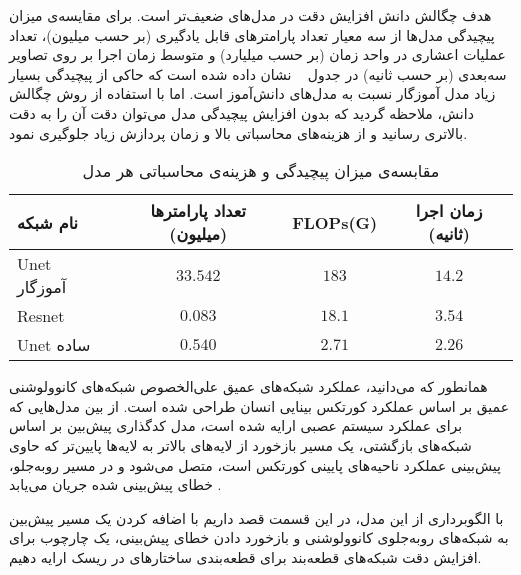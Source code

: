 هدف چگالش دانش افزایش دقت در مدل‌های ضعیف‌تر است. برای مقایسه‌ی میزان پیچیدگی مدل‌ها از سه معیار تعداد پارامترهای قابل یادگیری (بر حسب میلیون)، تعداد عملیات اعشاری در واحد زمان (بر حسب میلیارد) و متوسط زمان اجرا بر روی تصاویر سه‌بعدی (بر حسب ثانیه) در جدول ~ نشان داده شده است که حاکی از پیچیدگی بسیار زیاد مدل آموزگار نسبت به مدل‌های دانش‌آموز است. اما با استفاده از روش چگالش دانش، ملاحظه گردید که بدون افزایش پیچیدگی مدل می‌توان دقت آن را به دقت بالاتری رسانید و از هزینه‌های محاسباتی بالا و زمان پردازش زیاد جلوگیری نمود.


\begin{table}[H]
	\caption{مقابسه‌ی میزان پیچیدگی و هزینه‌ی محاسباتی هر مدل}
	\label{modelscomplexity}
	\centering
	\begin{tabular}{lccc}
		\toprule
		نام شبکه & تعداد پارامترها (میلیون) & FLOPs(G) &زمان اجرا (ثانیه) \\
		\midrule
		Unet آموزگار & $33.542$ & $183$ & $14.2$ \\
		Resnet & $0.083$ & $18.1$ & $3.54$ \\
		Unet ساده & $0.540$ & $2.71$ & $2.26$ \\
		
		\bottomrule
	\end{tabular}
\end{table}


همانطور که می‌دانید، عملکرد شبکه‌های عمیق علی‌الخصوص شبکه‌های کانوولوشنی عمیق بر اساس عملکرد کورتکس بینایی انسان طراحی شده است. از بین مدل‌هایی که برای عملکرد سیستم عصبی ارایه شده است، مدل کدگذاری پیش‌بین  بر اساس شبکه‌های بازگشتی، یک مسیر بازخورد از لایه‌های بالاتر به لایه‌ها پایین‌تر که حاوی پیش‌بینی عملکرد ناحیه‌های پایینی کورتکس است، متصل می‌شود و در مسیر روبه‌جلو، خطای پیش‌بینی شده جریان می‌یابد .  

با الگوبرداری از این مدل، در این قسمت قصد داریم با اضافه کردن یک مسیر پیش‌بین به شبکه‌های روبه‌جلوی کانوولوشنی و بازخورد دادن خطای پیش‌بینی، یک چارچوب برای افزایش دقت شبکه‌های قطعه‌بند برای قطعه‌بندی ساختارهای در ریسک ارایه دهیم.

